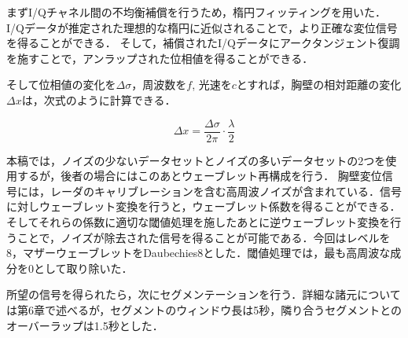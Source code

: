まずI/Qチャネル間の不均衡補償を行うため，楕円フィッティングを用いた．I/Qデータが推定された理想的な楕円に近似されることで，より正確な変位信号を得ることができる\cite{paper:ellipse1}\cite{paper:ellipse2}．
そして，補償されたI/Qデータにアークタンジェント復調を施すことで，アンラップされた位相値を得ることができる．

そして位相値の変化を$\Delta \sigma$，周波数を$f$, 光速を$c$とすれば，胸壁の相対距離の変化$\Delta x$は，次式のように計算できる．

\begin{equation}
	\Delta x = \frac{\Delta \sigma}{2 \pi} \cdot \frac{\lambda}{2}
	\end{equation}

本稿では，ノイズの少ないデータセットとノイズの多いデータセットの2つを使用するが，後者の場合にはこのあとウェーブレット再構成を行う．
胸壁変位信号には，レーダのキャリブレーションを含む高周波ノイズが含まれている．信号に対しウェーブレット変換を行うと，ウェーブレット係数を得ることができる．そしてそれらの係数に適切な閾値処理を施したあとに逆ウェーブレット変換を行うことで，ノイズが除去された信号を得ることが可能である．今回はレベルを8，マザーウェーブレットをDaubechies8とした．閾値処理では，最も高周波な成分を0として取り除いた．

所望の信号を得られたら，次にセグメンテーションを行う．詳細な諸元については第6章で述べるが，セグメントのウィンドウ長は5秒，隣り合うセグメントとのオーバーラップは1.5秒とした．

